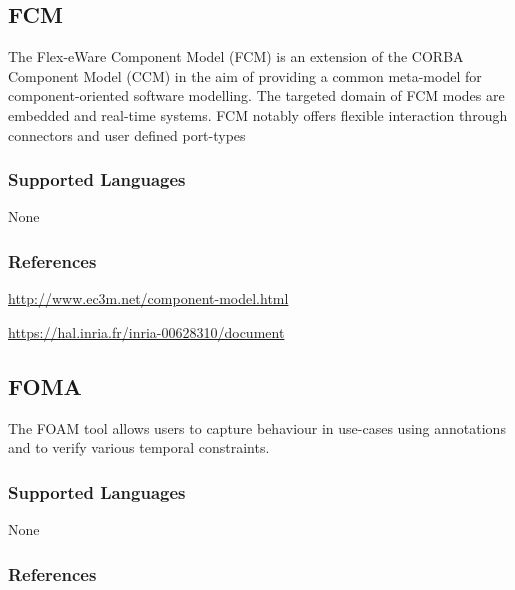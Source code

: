 \subsection{FCM}
\label{subsecT:FCM}


The Flex-eWare Component Model (FCM) is an extension of the CORBA Component Model (CCM) in the aim of providing a common meta-model for component-oriented software modelling.
The targeted domain of FCM modes are embedded and real-time systems. 
FCM notably offers flexible interaction through connectors and user defined port-types


\subsubsection{Supported Languages}

None


\subsubsection{References}

\url{http://www.ec3m.net/component-model.html}

\url{https://hal.inria.fr/inria-00628310/document}



\subsection{FOMA}
\label{subsecT:FOMA}


The FOAM tool allows users to capture behaviour in use-cases using annotations and to verify various temporal constraints.

\subsubsection{Supported Languages}

None


\subsubsection{References}

